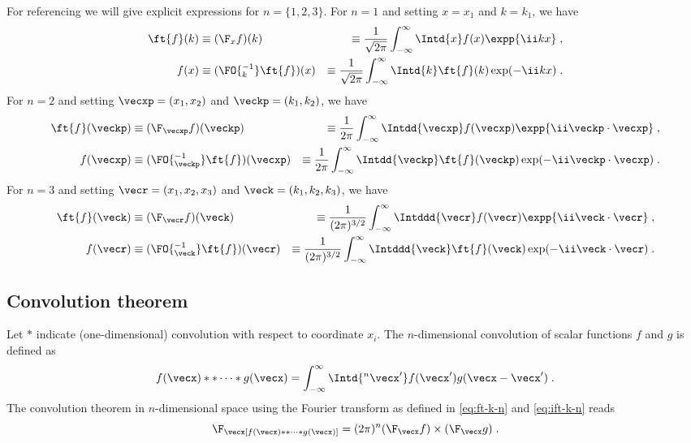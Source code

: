 \documentclass[
twoside,
openright,
titlepage,
numbers=noenddot,
headinclude,
fleqn,
a4paper,
footinclude=true,
cleardoublepage=empty,
abstractoff,
BCOR=5mm,
paper=a4,
fontsize=11pt,
british,ngerman,american,
]{scrreprt}
\begin{document}
For referencing we will give explicit expressions for $n=\{1,2,3\}$.
For $n=1$ and setting $x=x_1$ and $k=k_1$, we have
\begin{equation}
  \label{eq:ft-k-1}
  \begin{split}
      \ft{f}(k) &\equiv (\F_x f)(k) &\equiv
  \frac{1}{\sqrt{2\pi}}\int_{-\infty}^\infty \Intd{x} 
  f(x) \expp{\ii k x} \;, \\
  f(x) &\equiv (\FO{^{-1}_k} \ft{f})(x) &\equiv
  \frac{1}{\sqrt{2\pi}}\int_{-\infty}^\infty \Intd{k} 
  \ft{f}(k) \exp(-\ii k x) \;.
  \end{split}
\end{equation}
For $n=2$ and setting $\vecxp=(x_1,x_2)$ and $\veckp=(k_1,k_2)$, we
have
\begin{equation}
  \label{eq:ft-k-2}
  \begin{split}
    \ft{f}(\veckp) & \equiv (\F_{\vecxp} f)(\veckp) &\equiv
    \frac{1}{2\pi}\int_{-\infty}^\infty \Intdd{\vecxp} 
    f(\vecxp) \expp{\ii\veckp\cdot\vecxp} \;,
    \\   f(\vecxp) &\equiv (\FO{^{-1}_{\veckp}} \ft{f})(\vecxp) &\equiv
    \frac{1}{2\pi}\int_{-\infty}^\infty \Intdd{\veckp} 
    \ft{f}(\veckp) \exp(-\ii\veckp\cdot\vecxp) \;.
  \end{split}
\end{equation}
For $n=3$ and setting $\vecr=(x_1,x_2,x_3)$ and $\veck=(k_1,k_2,k_3)$,
we have
\begin{equation}
  \label{eq:ft-k-3}
  \begin{split}
    \ft{f}(\veck) &\equiv (\F_\vecr f)(\veck) &\equiv
    \frac{1}{(2\pi)^{3/2}}\int_{-\infty}^\infty\Intddd{\vecr}
    f(\vecr)\expp{\ii\veck\cdot\vecr} \;,
    \\  f(\vecr) &\equiv (\FO{^{-1}_\veck} \ft{f})(\vecr) &\equiv
  \frac{1}{(2\pi)^{3/2}}\int_{-\infty}^\infty \Intddd{\veck} 
  \ft{f}(\veck) \exp(-\ii\veck\cdot\vecr) \;.
  \end{split}
\end{equation}

\subsection{Convolution theorem}
\label{sec:convolution-k}

Let $\ast$ indicate (one-dimensional) convolution with respect to
coordinate $x_i$.  The $n$-dimensional convolution of scalar functions
$f$ and $g$ is defined as
\begin{equation}
  \label{eq:convolution-n}
  f(\vecx)\ast\ast\dots\ast g(\vecx) 
  = \int_{-\infty}^\infty\Intd{^n\vecx'}f(\vecx')g(\vecx-\vecx') \;.
\end{equation}
The convolution theorem in $n$-dimensional space using the Fourier
transform as defined in \cref{eq:ft-k-n} and \cref{eq:ift-k-n} reads
\begin{equation}
  \label{eq:convolution-theorem-k-n}
  \F_\vecx[f(\vecx)\ast\ast\dots\ast g(\vecx)] = 
  (2\pi)^n (\F_\vecx f) \times (\F_\vecx g) \;.
\end{equation}
\end{document}
